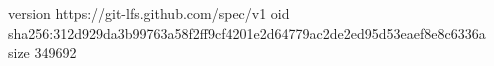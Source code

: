 version https://git-lfs.github.com/spec/v1
oid sha256:312d929da3b99763a58f2ff9cf4201e2d64779ac2de2ed95d53eaef8e8c6336a
size 349692
